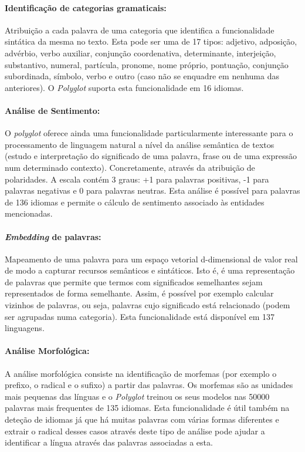 \documentclass{article}
\begin{document}
\paragraph{Identificação de categorias gramaticais:} Atribuição a cada palavra de uma categoria que identifica a funcionalidade sintática da mesma no texto. Esta pode ser uma de 17 tipos: adjetivo, adposição, advérbio, verbo auxiliar, conjunção coordenativa, determinante, interjeição, substantivo, numeral, partícula, pronome, nome próprio, pontuação, conjunção subordinada, símbolo, verbo e outro (caso não se enquadre em nenhuma das anteriores). O \textit{Polyglot} suporta esta funcionalidade em 16 idiomas\cite{post}.

\paragraph{Análise de Sentimento:} O \textit{polyglot} oferece ainda uma funcionalidade particularmente interessante para o processamento de linguagem natural a nível da análise semântica de textos (estudo e interpretação do significado de uma palavra, frase ou de uma expressão num determinado contexto). Concretamente, através da atribuição de polaridades. A escala contém 3 graus: +1 para palavras positivas, -1 para palavras negativas e 0 para palavras neutras. Esta análise é possível para palavras de 136 idiomas e permite o cálculo de sentimento associado às entidades mencionadas\cite{sent}.

\paragraph{\textit{Embedding} de palavras:} Mapeamento de uma palavra para um espaço vetorial d-dimensional de valor real de modo a capturar recursos semânticos e sintáticos. Isto é, é uma representação de palavras que permite que termos com significados semelhantes sejam representados de forma semelhante. Assim, é possível por exemplo calcular vizinhos de palavras, ou seja, palavras cujo significado está relacionado (podem ser agrupadas numa categoria). Esta funcionalidade está disponível em 137 linguagens\cite{emb}.

\paragraph{Análise Morfológica:} A análise morfológica consiste na identificação de morfemas (por exemplo o prefixo, o radical e o sufixo) a partir das palavras. Os morfemas são as unidades mais pequenas das línguas e o \textit{Polyglot} treinou os seus modelos nas 50000 palavras mais frequentes de 135 idiomas. Esta funcionalidade é útil também na deteção de idiomas já que há muitas palavras com várias formas diferentes e extrair o radical desses casos através deste tipo de análise pode ajudar a identificar a língua através das palavras associadas a esta\cite{ma}.
\end{document}

